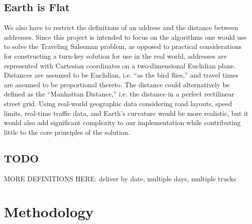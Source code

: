 \documentclass[letterpaper]{article}
\begin{document}
    \subsection{Earth is Flat}
    \label{subection:Earth_is_Flat}
    We also have to restrict the definitions of an address and the distance between addresses. Since this project is intended to focus on the algorithms one would use to solve the Traveling Salesman problem, as opposed to practical considerations for constructing a turn-key solution for use in the real world, addresses are represented with Cartesian coordinates on a two-dimensional Euclidian plane. Distances are assumed to be Euclidian, i.e. ``as the bird flies,'' and travel times are assumed to be proportional thereto. The distance could alternatively be defined as the ``Manhattan Distance,'' i.e. the distance in a perfect rectilinear street grid. Using real-world geographic data considering road layouts, speed limits, real-time traffic data, and Earth's curvature would be more realistic, but it would also add significant complexity to our implementation while contributing little to the core principles of the solution.

    \subsection{TODO}
    MORE DEFINITIONS HERE: deliver by date, multiple days, multiple trucks

    \section{Methodology}
    \label{section:Methodology}
\end{document}
